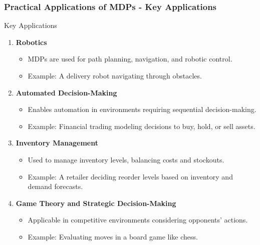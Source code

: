 \documentclass[aspectratio=169]{beamer}
\begin{document}
\begin{frame}[fragile]
    \frametitle{Practical Applications of MDPs - Key Applications}
    \begin{block}{Key Applications}
        \begin{enumerate}
            \item \textbf{Robotics}
                \begin{itemize}
                    \item MDPs are used for path planning, navigation, and robotic control.
                    \item Example: A delivery robot navigating through obstacles.
                \end{itemize}
            \item \textbf{Automated Decision-Making}
                \begin{itemize}
                    \item Enables automation in environments requiring sequential decision-making.
                    \item Example: Financial trading modeling decisions to buy, hold, or sell assets.
                \end{itemize}
            \item \textbf{Inventory Management}
                \begin{itemize}
                    \item Used to manage inventory levels, balancing costs and stockouts.
                    \item Example: A retailer deciding reorder levels based on inventory and demand forecasts.
                \end{itemize}
            \item \textbf{Game Theory and Strategic Decision-Making}
                \begin{itemize}
                    \item Applicable in competitive environments considering opponents' actions.
                    \item Example: Evaluating moves in a board game like chess.
                \end{itemize}
        \end{enumerate}
    \end{block}
\end{frame}
\end{document}
